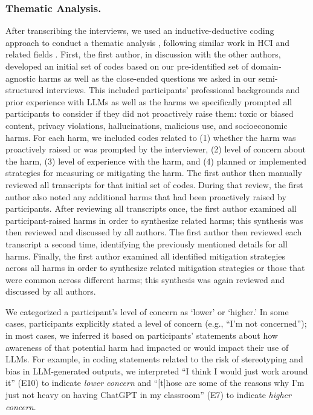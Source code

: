 \subsubsection*{Thematic Analysis.} 
After transcribing the interviews, we used an inductive-deductive coding approach to conduct a thematic analysis \cite{bogdan_qualitative_1998, braun_2006_using}, following similar work in HCI and related fields \citep[e.g.,][]{kawakami_situate_2024, birhane_values_2022}. First, the first author, in discussion with the other authors, developed an initial set of codes based on our pre-identified set of domain-agnostic harms as well as the close-ended questions we asked in our semi-structured interviews. This included participants' professional backgrounds and prior experience with LLMs as well as the harms we specifically prompted all participants to consider if they did not proactively raise them: toxic or biased content, privacy violations, hallucinations, malicious use, and socioeconomic harms. For each harm, we included codes related to (1) whether the harm was proactively raised or was prompted by the interviewer, (2) level of concern about the harm, (3) level of experience with the harm, and (4) planned or implemented strategies for measuring or mitigating the harm. The first author then manually reviewed all transcripts for that initial set of codes. During that review, the first author also noted any additional harms that had been proactively raised by participants. After reviewing all transcripts once, the first author examined all participant-raised harms in order to synthesize related harms; this synthesis was then reviewed and discussed by all authors. The first author then reviewed each transcript a second time, identifying the previously mentioned details for all harms. Finally, the first author examined all identified mitigation strategies across all harms in order to synthesize related mitigation strategies or those that were common across different harms; this synthesis was again reviewed and discussed by all authors.

We categorized a participant's level of concern as  `lower' or `higher.' In some cases, participants explicitly stated a level of concern (e.g., ``I'm not concerned''); in most cases, we inferred it based on participants' statements about how awareness of that potential harm had impacted or would impact their use of LLMs. For example, in coding statements related to the risk of stereotyping and bias in LLM-generated outputs, we interpreted ``I think I would just work around it'' (E10) to indicate \textit{lower concern} and ``[t]hose are some of the reasons why I'm just not heavy on having ChatGPT in my classroom'' (E7) to indicate \textit{higher concern}.


